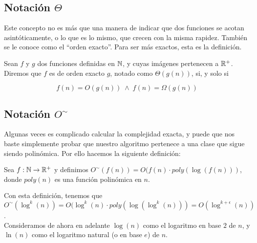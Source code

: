 \subsection{Notación $\Theta$}

Este concepto no es más que una manera de indicar que dos funciones se acotan asintóticamente, o lo que es lo mismo, que crecen con la misma rapidez. También se le conoce como el ``orden exacto''. Para ser más exactos, esta es la definición.

\begin{definicion}
	Sean $f$ y $g$ dos funciones definidas en $\mathbb{N}$, y cuyas imágenes pertenecen a $\mathbb{R}^+$. Diremos que $f$ es de orden exacto $g$, notado como $\Theta(g(n))$, si, y solo si
	
	$$f(n) = O(g(n))\;\wedge\;f(n) = \Omega(g(n))$$
\end{definicion}

\subsection{Notación $O^\sim$}

Algunas veces es complicado calcular la complejidad exacta, y puede que nos baste simplemente probar que nuestro algoritmo pertenece a una clase que sigue siendo polinómica. Por ello hacemos la siguiente definición:

\begin{definicion}
	Sea $f:\mathbb{N} \to \mathbb{R}^+$ y definimos $O^\sim(f(n)) = O(f(n) \cdot poly(\log(f(n)))$, donde $poly(n)$ es una función polinómica en $n$.
\end{definicion}

Con esta definición, tenemos que $O^\sim(\log^k(n)) = O(\log^k(n) \cdot poly(\log(\log^k(n))) = O(\log^{k+\epsilon}(n))$.\\

Consideramos de ahora en adelante $\log(n)$ como el logaritmo en base $2$ de $n$, y $\ln(n)$ como el logaritmo natural (o en base $e$) de $n$.

\endinput

